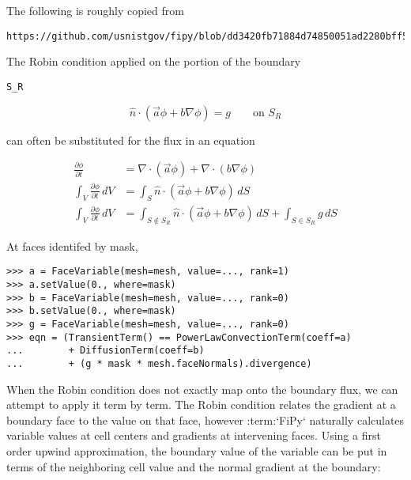 \documentclass{article}
\begin{document}
The following is roughly copied from
\begin{verbatim}
https://github.com/usnistgov/fipy/blob/dd3420fb71884d74850051ad2280bff525301824/documentation/USAGE.rst
\end{verbatim} 

The Robin condition applied on the portion of the boundary
\begin{verbatim}
S_R							  
\end{verbatim}

\begin{equation*}
\hat{n}\cdot\left(\vec{a}\phi + b\nabla\phi\right) = g\qquad\text{on $S_R$}
\end{equation*} 

can often be substituted for the flux in an equation

\begin{equation*}
\begin{aligned}
\frac{\partial\phi}{\partial t}
&= \nabla\cdot\left(\vec{a}\phi\right) + \nabla\cdot\left(b\nabla\phi\right)
\\
\int_V\frac{\partial\phi}{\partial t}\,dV
&= \int_S \hat{n} \cdot \left(\vec{a}\phi + b\nabla\phi\right) \, dS
\\
\int_V\frac{\partial\phi}{\partial t}\,dV
&= \int_{S \notin S_R} \hat{n} \cdot \left(\vec{a}\phi + b\nabla\phi\right) \, dS
+ \int_{S \in S_R} g \, dS
\end{aligned}
\end{equation*} 

At faces identifed by mask,

\begin{verbatim}
>>> a = FaceVariable(mesh=mesh, value=..., rank=1)
>>> a.setValue(0., where=mask)
>>> b = FaceVariable(mesh=mesh, value=..., rank=0)
>>> b.setValue(0., where=mask)
>>> g = FaceVariable(mesh=mesh, value=..., rank=0)
>>> eqn = (TransientTerm() == PowerLawConvectionTerm(coeff=a)
...        + DiffusionTerm(coeff=b)
...        + (g * mask * mesh.faceNormals).divergence)
\end{verbatim} 

When the Robin condition does not exactly map onto the boundary flux, we can attempt to apply it term by term. The Robin condition relates the gradient at a boundary face to the value on that face, however :term:`FiPy` naturally calculates variable values at cell centers and gradients at intervening faces. Using a first order upwind approximation, the boundary value of the variable can be put in terms of the neighboring cell value and the normal gradient at the boundary:
\end{document}
